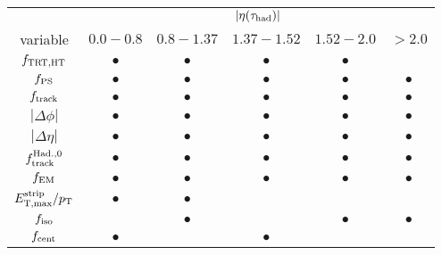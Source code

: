 \begin{tabular}{c|ccccc}
                       & \multicolumn{5}{c}{$|\eta(\tauh)|$} \\
  variable             & $0.0 - 0.8$ & $0.8 - 1.37$ & $1.37 - 1.52$ & $1.52 - 2.0$ & $> 2.0$   \\
  \hline
  $f_\mathrm{TRT,HT}$         & $\bullet$   & $\bullet$    & $\bullet$     & $\bullet$    &           \\
  $f_\mathrm{PS}$       & $\bullet$   & $\bullet$    & $\bullet$     & $\bullet$    & $\bullet$ \\
  $f_\mathrm{track}$  & $\bullet$   & $\bullet$    & $\bullet$     & $\bullet$    & $\bullet$ \\
  $|\Delta\phi|$       & $\bullet$   & $\bullet$    & $\bullet$     & $\bullet$    & $\bullet$ \\
  $|\Delta\eta|$       & $\bullet$   & $\bullet$    & $\bullet$     & $\bullet$    & $\bullet$ \\
  $f^\mathrm{Had.,0}_{\mathrm{track}}$         & $\bullet$   & $\bullet$    & $\bullet$     & $\bullet$    & $\bullet$ \\
  $f_\mathrm{EM}$            & $\bullet$   & $\bullet$    & $\bullet$     & $\bullet$    & $\bullet$ \\
  $E_\mathrm{T,max}^\mathrm{strip}/p_{\mathrm{T}}$     & $\bullet$   & $\bullet$    &               &              &           \\
  $f_\mathrm{iso}$           &             & $\bullet$    &               & $\bullet$    & $\bullet$ \\
  $f_\mathrm{cent}$    & $\bullet$   &              & $\bullet$     &              &           \\
\end{tabular}

